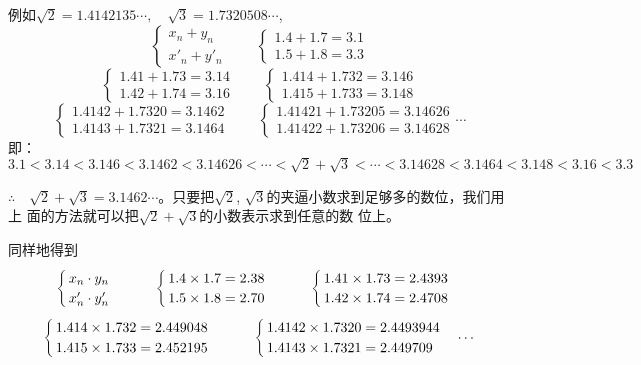 例如$\sqrt{2}=1.4142135\cdots,\quad \sqrt{3}=1.7320508\cdots$,
\[\begin{cases}
    x_n+y_n\\  x'_n+y'_n
\end{cases}\qquad \begin{cases}
    1.4+1.7=3.1 \\ 1.5+1.8=3.3
\end{cases}\]
\[\begin{cases}
    1.41+1.73=3.14\\1.42+1.74=3.16
\end{cases}\qquad \begin{cases}
    1.414+1.732=3.146\\1.415+1.733=3.148
\end{cases}\]
\[\begin{cases}
    1.4142+1.7320=3.1462\\
1.4143+1.7321=3.1464
\end{cases}\qquad \begin{cases}
    1.41421+1.73205=3.14626\\
1.41422+1.73206=3.14628
\end{cases}\cdots\]
即：
$3.1 <3.14<3.146<3.1462<3.14626<\cdots <\sqrt{2}+\sqrt{3}<\cdots <3.14628<3.1464<3.148<3.16<3.3$

$\therefore\quad \sqrt{2}+\sqrt{3}=3.1462\cdots$。只要把$\sqrt{2}$, $\sqrt{3}$的夹逼小数求到足够多的数位，我们用上
面的方法就可以把$\sqrt{2}+\sqrt{3}$的小数表示求到任意的数
位上。

同样地得到
\[\begin{cases}
    x_n\cdot y_n\\  x'_n\cdot y'_n
\end{cases}\qquad \begin{cases}
    1.4\times 1.7=2.38 \\ 1.5\times 1.8=2.70
\end{cases}\qquad \begin{cases}
    1.41\times 1.73=2.4393\\1.42\times 1.74=2.4708
\end{cases}\]
\[\begin{cases}
    1.414\times 1.732=2.449048\\1.415\times 1.733=2.452195
\end{cases}\qquad \begin{cases}
    1.4142\times 1.7320=2.4493944\\
1.4143\times 1.7321=2.449709
\end{cases}\cdots\]

